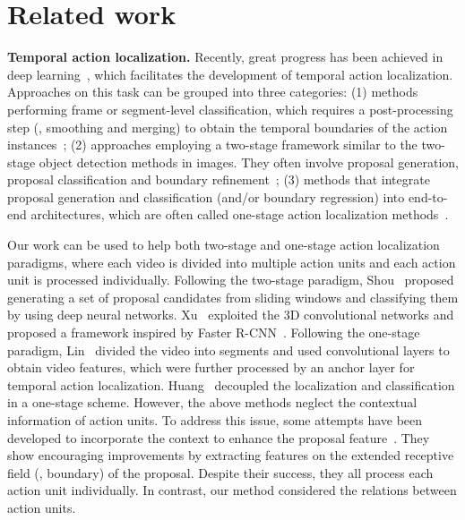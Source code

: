\documentclass[10pt,journal,compsoc]{IEEEtran}
\begin{document}
	\section{Related work}\label{Sec:related}
	\textbf{Temporal action localization.} Recently, great progress has been achieved in deep learning~\cite{carreira2017quo,tran2015learning,wang2016temporal}, which facilitates the development of temporal action localization. Approaches on this task can be grouped into three categories: (1)  methods performing frame or segment-level classification, which requires a post-processing step (\eg, smoothing and merging) to obtain the temporal boundaries of the action instances~\cite{shou2017cdc,montes2016temporal,piergiovanni2019temporal}; (2) approaches employing a two-stage framework similar to the two-stage object detection methods in images. They often involve proposal generation, proposal classification and boundary refinement~\cite{shou2016temporal,xu2017r,zhao2017temporal}; (3) methods that integrate proposal generation and classification (and/or boundary regression) into end-to-end architectures, which are often called one-stage action localization methods~\cite{yeung2016end,buch2017end,lin2017single}. 
	
	Our work can be used to help both two-stage and one-stage action localization paradigms, where each video is divided into multiple action units and each action unit is processed individually. 
	Following the two-stage paradigm, Shou~\etal\cite{shou2016temporal} proposed generating a set of proposal candidates from sliding windows and classifying them by using deep neural networks.
	Xu~\etal\cite{xu2017r} exploited the 3D convolutional networks and proposed a framework inspired by Faster R-CNN~\cite{ren2015faster}. Following the one-stage paradigm, Lin~\etal\cite{lin2017single} divided the video into segments and used convolutional layers to obtain video features, which were further processed by an anchor layer for temporal action localization. Huang~\etal\cite{huang2019decoupling} decoupled the localization and classification in a one-stage scheme.
	However, the above methods neglect the contextual information of action units. To address this issue, some attempts have been developed to incorporate the context to enhance the proposal feature~\cite{dai2017temporal, gao2017turn, gao2017cascaded, zhao2017temporal, chao2018rethinking}. They show encouraging improvements by extracting features on the extended receptive field (\ie, boundary) of the proposal.
	Despite their success, they all process each action unit individually. In contrast, our method considered the relations between action units.
	
\end{document}
